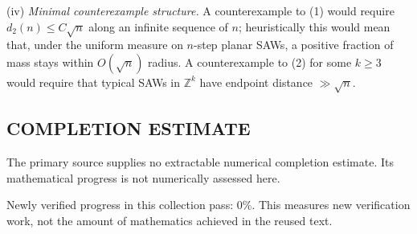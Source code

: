 (iv) \emph{Minimal counterexample structure.} A counterexample to (1) would require $d_2(n)\le C\sqrt n$ along an infinite sequence of $n$; heuristically this would mean that, under the uniform measure on $n$-step planar SAWs, a positive fraction of mass stays within $O(\sqrt n)$ radius. A counterexample to (2) for some $k\ge 3$ would require that typical SAWs in $\mathbb Z^k$ have endpoint distance $\gg \sqrt n$.




\subsection*{COMPLETION ESTIMATE}
The primary source supplies no extractable numerical completion estimate. Its mathematical progress is not numerically assessed here.

Newly verified progress in this collection pass: $0\%$. This measures new verification work, not the amount of mathematics achieved in the reused text.
